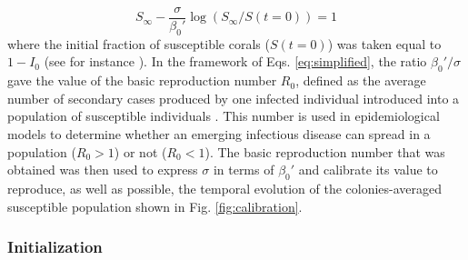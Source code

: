 \begin{equation}
    S_\infty - \frac{\sigma}{\beta_0'}\log(S_{\infty}/S(t=0)) = 1\label{eq:ratio}
\end{equation}
where the initial fraction of susceptible corals ($S(t=0)$) was taken equal to $1-I_0$ (see for instance \cite{Murray07}). In the framework of Eqs. \ref{eq:simplified}, the ratio $\beta_0'/\sigma$ gave the value of the basic reproduction number $R_0$, defined as the average number of secondary cases produced by one infected individual introduced into a population of susceptible individuals \citep{keeling2007stochastic}. This number is used in epidemiological models to determine whether an emerging infectious disease can spread in a population ($R_0 > 1$) or not ($R_0 < 1$). The basic reproduction number that was obtained was then used to express $\sigma$ in terms of $\beta_0'$ and calibrate its value to reproduce, as well as possible, the temporal evolution of the colonies-averaged susceptible population shown in Fig. \ref{fig:calibration}.

\subsubsection{Initialization} \label{sec:init}

